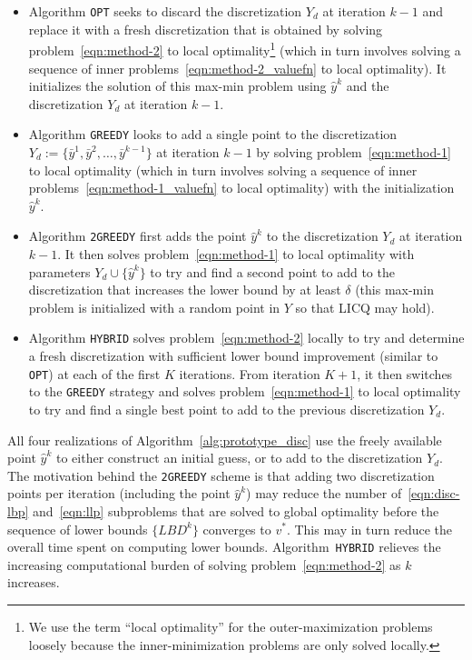 \documentclass{article}
\newcommand{\1}[1]{\mathds{1}\left[#1\right]}
\begin{document}
\begin{itemize}
\item Algorithm \texttt{OPT} seeks to discard the discretization $Y_d$ at iteration \mbox{$k-1$} and replace it with a fresh discretization that is obtained by solving problem~\eqref{eqn:method-2} to local optimality\footnote{\label{note1}We use the term ``local optimality'' for the outer-maximization problems loosely because the inner-minimization problems are only solved locally.} (which in turn involves solving a sequence of inner problems~\eqref{eqn:method-2_valuefn} to local optimality).
It initializes the solution of this max-min problem using $\hat{y}^k$ and the discretization $Y_d$ at iteration $k-1$.

\item Algorithm \texttt{GREEDY} looks to add a single point to the discretization $Y_d := \{\bar{y}^1,\bar{y}^2,\dots,\bar{y}^{k-1}\}$ at iteration $k-1$ by solving problem~\eqref{eqn:method-1} to local optimality (which in turn involves solving a sequence of inner problems~\eqref{eqn:method-1_valuefn} to local optimality) with the initialization $\hat{y}^k$.

\item Algorithm \texttt{2GREEDY} first adds the point $\hat{y}^k$ to the discretization $Y_d$ at iteration $k-1$.
It then solves problem~\eqref{eqn:method-1} to local optimality with parameters $Y_d \cup \{\hat{y}^k\}$ to try and find a second point to add to the discretization that increases the lower bound by at least $\delta$ (this max-min problem is initialized with a random point in $Y$ so that LICQ may hold).

\item Algorithm \texttt{HYBRID} solves problem~\eqref{eqn:method-2} locally to try and determine a fresh discretization with sufficient lower bound improvement (similar to \texttt{OPT}) at each of the first $K$ iterations.
From iteration $K+1$, it then switches to the \texttt{GREEDY} strategy and solves problem~\eqref{eqn:method-1} to local optimality to try and find a single best point to add to the previous discretization $Y_d$.
\end{itemize}

\noindent 
All four realizations of Algorithm~\ref{alg:prototype_disc} use the freely available point $\hat{y}^k$ to either construct an initial guess, or to add to the discretization $Y_d$.
The motivation behind the \texttt{2GREEDY} scheme is that adding two discretization points per iteration (including the point $\hat{y}^k$) may reduce the number of~\eqref{eqn:disc-lbp} and~\eqref{eqn:llp} subproblems that are solved to global optimality before the sequence of lower bounds $\{LBD^k\}$ converges to $v^*$.
This may in turn reduce the overall time spent on computing lower bounds.
Algorithm~\texttt{HYBRID} relieves the increasing computational burden of solving problem~\eqref{eqn:method-2} as $k$ increases.
\end{document}
